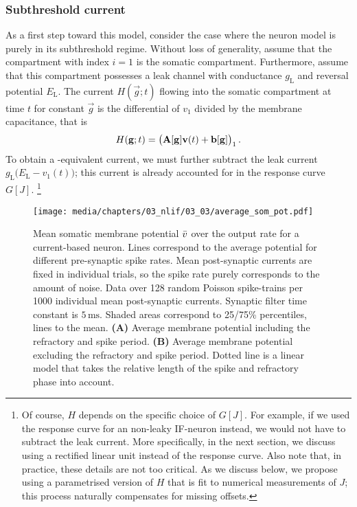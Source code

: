 \subsubsection{Subthreshold current}
As a first step toward this model, consider the case where the neuron model is purely in its subthreshold regime.
Without loss of generality, assume that the compartment with index $i = 1$ is the somatic compartment.
Furthermore, assume that this compartment possesses a leak channel with conductance $g_\mathrm{L}$ and reversal potential $E_\mathrm{L}$.
The current $H(\vec g; t)$ flowing into the somatic compartment at time $t$ for constant $\vec g$ is the differential of $v_1$ divided by the membrane capacitance, that is
\begin{align}
	H(\mathbf{g}; t) = \big(\mathbf{A}[\mathbf{g}] \mathbf{v}(t) + \mathbf{b}[\mathbf{g}] \big)_1 \,.
	\label{eqn:nlif_sub_momentary}
\end{align}
To obtain a \LIF-equivalent current, we must further subtract the leak current $g_\mathrm{L} \big( E_\mathrm{L} - v_1(t) \big)$; this current is already accounted for in the \LIF response curve $G[J]$.%
\footnote{
Of course, $H$ depends on the specific choice of $G[J]$.
For example, if we used the response curve for an non-leaky IF-neuron instead, we would not have to subtract the leak current.
More specifically, in the next section, we discuss using a rectified linear unit instead of the \LIF response curve.
Also note that, in practice, these details are not too critical.
As we discuss below, we propose using a parametrised version of $H$ that is fit to numerical measurements of $J$; this process naturally compensates for missing offsets.
}

\begin{figure}[p]
	\centering
	\texttt{[image: media/chapters/03\_nlif/03\_03/average\_som\_pot.pdf]}%
	{\label{fig:avg_vsom_a}}%
	{\label{fig:avg_vsom_b}}%
	\caption[Mean somatic membrane potential over the neuron output rate]{Mean somatic membrane potential ${{\bar v}}$ over the output rate for a current-based \LIF neuron. Lines correspond to the average potential for different pre-synaptic spike rates.
	Mean post-synaptic currents are fixed in individual trials, so the spike rate purely corresponds to the amount of noise.
	Data over 128 random Poisson spike-trains per 1000 individual mean post-synaptic currents.
	Synaptic filter time constant is $5\,\mathrm{ms}$. Shaded areas correspond to 25/75\% percentiles, lines to the mean.
	\textbf{(A)} Average membrane potential including the refractory and spike period.
	\textbf{(B)} Average membrane potential excluding the refractory and spike period. Dotted line is a  linear model that takes the relative length of the spike and refractory phase into account.}
	\label{fig:avg_vsom}
\end{figure}


